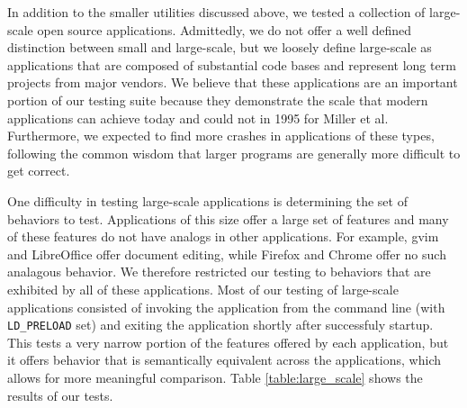 In addition to the smaller utilities discussed above, we tested a collection of large-scale open source applications. Admittedly, we do not offer a well defined distinction between small and large-scale, but we loosely define large-scale as applications that are composed of substantial code bases and represent long term projects from major vendors. We believe that these applications are an important portion of our testing suite because they demonstrate the scale that modern applications can achieve today and could not in 1995 for Miller et al. Furthermore, we expected to find more crashes in applications of these types, following the common wisdom that larger programs are generally more difficult to get correct.


One difficulty in testing large-scale applications is determining the set of behaviors to test. Applications of this size offer a large set of features and many of these features do not have analogs in other applications. For example, gvim and LibreOffice offer document editing, while Firefox and Chrome offer no such analagous behavior. We therefore restricted our testing to behaviors that are exhibited by all of these applications. Most of our testing of large-scale applications consisted of invoking the application from the command line (with \texttt{LD\_PRELOAD} set) and exiting the application shortly after successfuly startup. This tests a very narrow portion of the features offered by each application, but it offers behavior that is semantically equivalent across the applications, which allows for more meaningful comparison. Table \ref{table:large_scale} shows the results of our tests.

